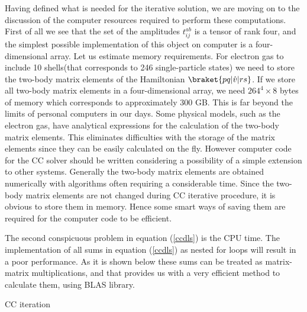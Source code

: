 \documentclass[twoside,english]{uiofysmaster}
\begin{document}
Having defined what is needed for the iterative solution, we are moving on to the discussion of the computer resources required to perform these computations. First of all we see that the set of the amplitudes $t_{ij}^{ab}$ is a tensor of rank four, and the simplest possible implementation of this object on computer is a four-dimensional array. Let us estimate memory requirements.
For electron gas to include 10 shells(that corresponds to 246 single-particle states) we need to store the two-body matrix elements of the Hamiltonian $\braket{pq|\hat{v}|rs}$. If we store all two-body matrix elements in a four-dimensional array, we need $264^4 \times 8$ bytes of memory which corresponds to approximately 300 GB. This is far beyond the limits of personal computers in our days. Some physical models, such as the electron gas, have analytical expressions for the calculation of the two-body matrix elements. This eliminates difficulties with the storage of the matrix elements since they can be easily calculated on the fly. However computer code for the CC solver should be written considering a possibility of a simple extension to other systems. Generally the two-body matrix elements are obtained numerically with algorithms often requiring a considerable time. Since the two-body matrix elements are not changed during CC iterative procedure, it is obvious to store them in memory. Hence some smart ways of saving them are required for the computer code to be efficient.

The second conspicuous problem in equation (\ref{ccdls}) is the CPU time. The implementation of all sums in equation (\ref{ccdls}) as nested for loops will result in a poor performance. As it is shown below these sums can be treated as matrix-matrix multiplications, and that provides us with a very efficient method to calculate them, using BLAS library\cite{GeijnScienceProgrammingMatrix2008}.



\IncMargin{1em}
\begin{algorithm}[H]
	\BlankLine
	\caption{CC iteration}\label{CCIteration}
\end{algorithm}\DecMargin{1em}
\end{document}
